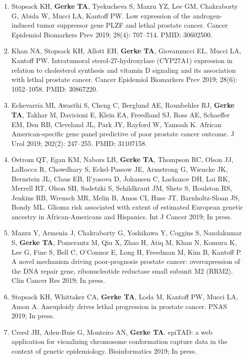 \documentclass[11pt, a4paper]{article} %
\begin{document}
\begin{enumerate}[leftmargin=*]
\item{} Stopsack KH, {\bf Gerke TA}, Tyekucheva S, Mazzu YZ, Lee GM, Chakraborty G, Abida W, Mucci LA, Kantoff PW. Low expression of the androgen-induced tumor suppressor gene PLZF and lethal prostate cancer. Cancer Epidemiol Biomarkers Prev 2019; 28(4): 707--714. PMID: 30602500. 

\item{} Khan NA, Stopsack KH, Allott EH, {\bf Gerke TA}, Giovannucci EL, Mucci LA, Kantoff PW. Intratumoral sterol-27-hydroxylase (CYP27A1) expression in relation to cholesterol synthesis and vitamin D signaling and its association with lethal prostate cancer. Cancer Epidemiol Biomarkers Prev 2019; 28(6): 1052--1058. PMID: 30867220.

\item{} Echevarria MI, Awasthi S, Cheng C, Berglund AE, Rounbehler RJ, {\bf Gerke TA}, Takhar M, Davicioni E, Klein EA, Freedland SJ, Ross AE, Schaeffer EM, Den RB, Cleveland JL, Park JY, Rayford W, Yamoah K. African American-specific gene panel predictive of poor prostate cancer outcome. J Urol 2019; 202(2): 247--255. PMID: 31107158.

\item{} Ostrom QT, Egan KM, Nabors LB, {\bf Gerke TA}, Thompson RC, Olson JJ, LaRocca R, Chowdhary S, Eckel-Passow JE, Armstrong G, Wiencke JK, Bernstein JL, Claus EB, Il'yasova D, Johansen C, Lachance DH, Lai RK, Merrell RT, Olson SH, Sadetzki S, Schildkraut JM, Shete S, Houlston RS, Jenkins RB, Wrensch MR, Melin B, Amos CI, Huse JT, Barnholtz-Sloan JS, Bondy ML. Glioma risk associated with extent of estimated European genetic ancestry in African-Americans and Hispanics. Int J Cancer 2019; In press.

\item{} Mazzu Y, Armenia J, Chakraborty G, Yoshikawa Y, Coggins S, Nandakumar S, {\bf Gerke TA}, Pomerantz M, Qiu X, Zhao H, Atiq M, Khan N, Komura K, Lee G, Fine S, Bell C, O'Connor E, Long H, Freedman M, Kim B, Kantoff P. A novel mechanism driving poor-prognosis prostate cancer: overexpression of the DNA repair gene, ribonucleotide reductase small subunit M2 (RRM2). Clin Cancer Res 2019; In press.

\item{} Stopsack KH, Whittaker CA, {\bf Gerke TA}, Loda M, Kantoff PW, Mucci LA, Amon A. Aneuploidy drives lethal progression in prostate cancer. PNAS 2019; In press.

\item{} Creed JH, Aden-Buie G, Monteiro AN, {\bf Gerke TA}. epiTAD: a web application for visualizing chromosome conformation capture data in the context of genetic epidemiology. Bioinformatics 2019; In press.


\end{enumerate}
\end{document}
